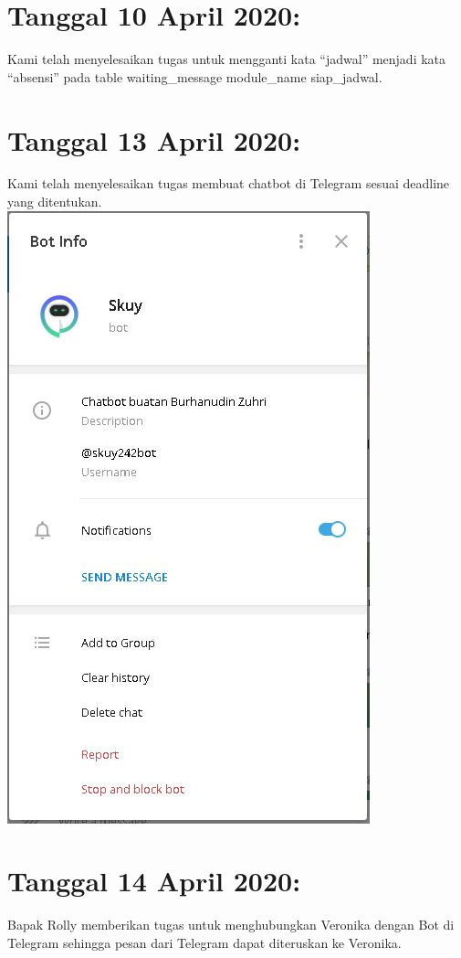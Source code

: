 \documentclass{article}
\begin{document}
\section{Tanggal 10 April 2020:}
Kami telah menyelesaikan tugas untuk mengganti kata “jadwal” menjadi kata “absensi” pada table waiting\_message module\_name siap\_jadwal.
	\newline
	\newline

\section{Tanggal 13 April 2020:}
Kami telah menyelesaikan tugas membuat chatbot di Telegram sesuai deadline yang ditentukan.
	\newline
	\includegraphics[scale=0.5]{0.jpg}
	\newline

\section{Tanggal 14 April 2020:}
Bapak Rolly memberikan tugas untuk menghubungkan Veronika dengan Bot di Telegram sehingga pesan dari Telegram dapat diteruskan ke Veronika.
	\newline
	\newline
\end{document}
